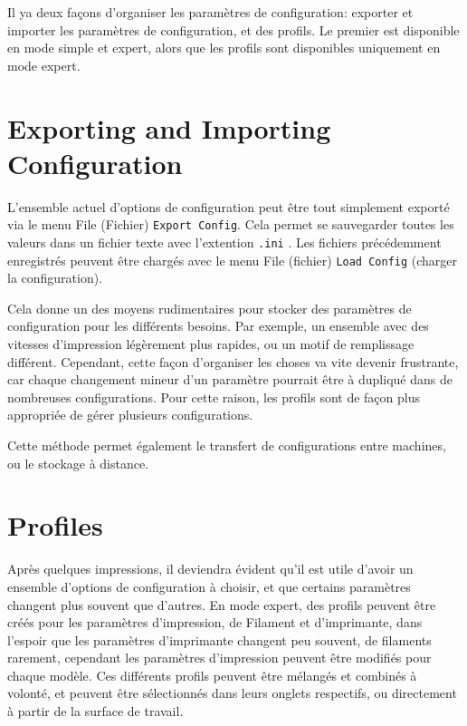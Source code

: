 
Il ya deux façons d'organiser les paramètres de configuration: exporter et importer les paramètres de configuration, et des profils. Le premier est disponible en mode simple et expert, alors que les profils sont disponibles uniquement en mode expert.

\section{Exporting and Importing Configuration} %
\label{sub:exporting_and_importing_configuration}

L'ensemble actuel d'options de configuration peut être tout simplement exporté via le menu File (Fichier)  \texttt{Export Config}. Cela permet se sauvegarder toutes les valeurs dans un fichier texte avec l'extention \texttt{.ini} .  Les fichiers précédemment enregistrés peuvent être chargés avec le menu File (fichier) \texttt{Load Config} (charger la configuration).

Cela donne un des moyens rudimentaires pour stocker des paramètres de configuration pour les différents besoins. Par exemple, un ensemble avec des vitesses d'impression légèrement plus rapides, ou un motif de remplissage différent. Cependant, cette façon d'organiser les choses va vite devenir frustrante, car chaque changement mineur d'un paramètre pourrait être à dupliqué dans de nombreuses configurations. Pour cette raison, les profils sont de façon plus appropriée de gérer plusieurs configurations.

Cette méthode permet également le transfert de configurations entre machines, ou le stockage à distance.



\section{Profiles} %
\label{sec:profiles}

Après quelques impressions, il deviendra évident qu'il est utile d'avoir un ensemble d'options de configuration à choisir, et que certains paramètres changent plus souvent que d'autres. En mode expert, des profils peuvent être créés pour les paramètres d'impression, de Filament et d'imprimante, dans l'espoir que les paramètres d'imprimante changent peu souvent, de filaments rarement, cependant les paramètres d'impression peuvent être modifiés pour chaque modèle. Ces différents profils peuvent être mélangés et combinés à volonté, et peuvent être sélectionnés dans leurs onglets respectifs, ou directement à partir de la surface de travail.


